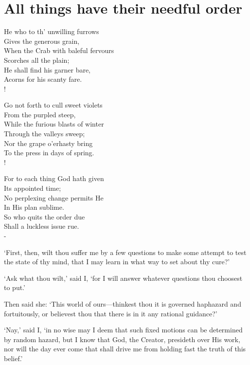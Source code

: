 \documentclass[12pt]{book}
\newenvironment{vpoem}[1]%
  {\def\poemvsindentlines{#1}\begin{poem}\small}%
  {\end{poem}\def\poemvsindentlines{\relax}}
\begin{document}
\section{All things have their needful order}

\begin{vpoem}{24}
    He who to th' unwilling furrows \\
      Gives the generous grain, \\
    When the Crab with baleful fervours \\
      Scorches all the plain; \\
    He shall find his garner bare, \\
    Acorns for his scanty fare. \\!

    Go not forth to cull sweet violets \\
      From the purpled steep, \\
    While the furious blasts of winter \\
      Through the valleys sweep; \\
    Nor the grape o'erhasty bring \\
    To the press in days of spring. \\!

    For to each thing God hath given \\
      Its appointed time; \\
    No perplexing change permits He \\
      In His plan sublime. \\
    So who quits the order due \\
    Shall a luckless issue rue. \\-
\end{vpoem}


`First, then, wilt thou suffer me by a few questions to make some
attempt to test the state of thy mind, that I may learn in what way to
set about thy cure?'

`Ask what thou wilt,' said I, `for I will answer whatever questions thou
choosest to put.'

Then said she: `This world of ours---thinkest thou it is governed
haphazard and fortuitously, or believest thou that there is in it any
rational guidance?'

`Nay,' said I, `in no wise may I deem that such fixed motions can be
determined by random hazard, but I know that God, the Creator, presideth
over His work, nor will the day ever come that shall drive me from
holding fast the truth of this belief.'
\end{document}
